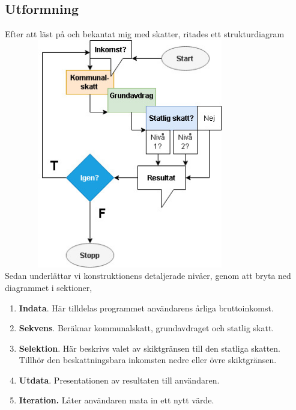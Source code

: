 \documentclass[../main.tex]{subfiles}
\begin{document}
\subsection{Utformning}

Efter att läst på och bekantat mig med skatter, ritades ett strukturdiagram\\

\includegraphics[width=11cm, height=10cm]{Projekt/Inkomstskatt/figs/strukturdiagram01.jpg}
\\
Sedan underlättar vi konstruktionens detaljerade nivåer, genom att bryta ned diagrammet i sektioner,

\begin{tcolorbox}[colback=gray!5!white,colframe=black!75!black]

\begin{enumerate}

    \item \textbf{Indata}. Här tilldelas programmet användarens årliga bruttoinkomst.
    
    \item \textbf{Sekvens}. Beräknar kommunalskatt, grundavdraget och statlig skatt. 
    
    \item \textbf{Selektion}. Här beskrivs valet av skiktgränsen till den statliga skatten. Tillhör den beskattningsbara inkomsten nedre eller övre skiktgränsen.
    
    \item \textbf{Utdata}. Presentationen av resultaten till användaren.
    
    \item \textbf{Iteration.} Låter användaren mata in ett nytt värde.
    
\end{enumerate}

\end{tcolorbox}

\newpage
\end{document}
